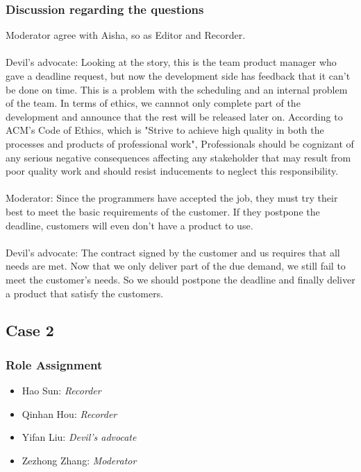 		\subsubsection{Discussion regarding the questions}
        Moderator agree with Aisha, so as Editor and Recorder.\\\\
        Devil’s advocate: Looking at the story, this is the team product manager who gave a deadline request, but now the development side has feedback that it can't be done on time. This is a problem with the scheduling and an internal problem of the team. In terms of ethics, we cannnot only complete part of the development and announce that the rest will be released later on. According to ACM’s Code of Ethics, which is "Strive to achieve high quality in both the processes and products of professional work", Professionals should be cognizant of any serious negative consequences affecting any stakeholder that may result from poor quality work and should resist inducements to neglect this responsibility.\\\\
        Moderator: Since the programmers have accepted the job, they must try their best to meet the basic requirements of the customer. If they postpone the deadline, customers will even don't have a product to use.\\\\
        Devil’s advocate: The contract signed by the customer and us requires that all needs are met. Now that we only deliver part of the due demand, we still fail to meet the customer's needs. So we should postpone the deadline and finally deliver a product that satisfy the customers.
        
	\subsection{Case 2}
		\subsubsection{Role Assignment}
		\begin{itemize}
  			\item Hao Sun: \emph{Recorder}
  			\item Qinhan Hou: \emph{Recorder}
  			\item Yifan Liu: \emph{Devil’s advocate}
  			\item Zezhong Zhang: \emph{Moderator}
		\end{itemize}

